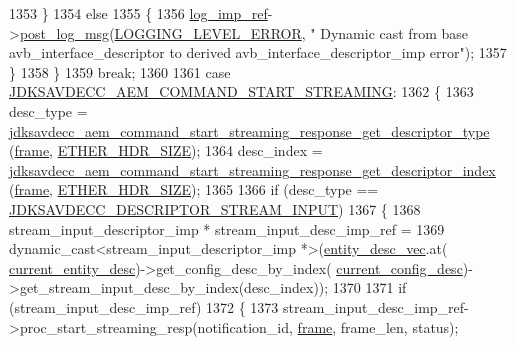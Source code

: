 \begin{DoxyCode}
{{{1353         \}
1354         \textcolor{keywordflow}{else}
1355         \{
1356             \hyperlink{namespaceavdecc__lib_acbe3e2a96ae6524943ca532c87a28529}{log\_imp\_ref}->\hyperlink{classavdecc__lib_1_1log_a68139a6297697e4ccebf36ccfd02e44a}{post\_log\_msg}(\hyperlink{namespaceavdecc__lib_a501055c431e6872ef46f252ad13f85cdaf2c4481208273451a6f5c7bb9770ec8a}{LOGGING\_LEVEL\_ERROR}, \textcolor{stringliteral}{"
      Dynamic cast from base avb\_interface\_descriptor to derived avb\_interface\_descriptor\_imp error"});
1357         \}
1358     \}
1359     \textcolor{keywordflow}{break};
1360 
1361     \textcolor{keywordflow}{case} \hyperlink{group__command_ga02c5a086ab474b1e4d7786286811a680}{JDKSAVDECC\_AEM\_COMMAND\_START\_STREAMING}:
1362     \{
1363         desc\_type = 
      \hyperlink{group__command__start__streaming__response_ga89f9710e58a269070610321fa9d67fc6}{jdksavdecc\_aem\_command\_start\_streaming\_response\_get\_descriptor\_type}
      (\hyperlink{gst__avb__playbin_8c_ac8e710e0b5e994c0545d75d69868c6f0}{frame}, \hyperlink{namespaceavdecc__lib_a6c827b1a0d973e18119c5e3da518e65ca9512ad9b34302ba7048d88197e0a2dc0}{ETHER\_HDR\_SIZE});
1364         desc\_index = 
      \hyperlink{group__command__start__streaming__response_ga5d4e2d26cf8b8a6301bf06db86c020c8}{jdksavdecc\_aem\_command\_start\_streaming\_response\_get\_descriptor\_index}
      (\hyperlink{gst__avb__playbin_8c_ac8e710e0b5e994c0545d75d69868c6f0}{frame}, \hyperlink{namespaceavdecc__lib_a6c827b1a0d973e18119c5e3da518e65ca9512ad9b34302ba7048d88197e0a2dc0}{ETHER\_HDR\_SIZE});
1365 
1366         \textcolor{keywordflow}{if} (desc\_type == \hyperlink{group__descriptor_ga4eb0b7597f11b5fc36f3625acd82e503}{JDKSAVDECC\_DESCRIPTOR\_STREAM\_INPUT})
1367         \{
1368             stream\_input\_descriptor\_imp * stream\_input\_desc\_imp\_ref =
1369                 \textcolor{keyword}{dynamic\_cast<}stream\_input\_descriptor\_imp *\textcolor{keyword}{>}(\hyperlink{classavdecc__lib_1_1end__station__imp_a72edab41bc56e3c1757944a7df188a3d}{entity\_desc\_vec}.at(
      \hyperlink{classavdecc__lib_1_1end__station__imp_afd78c89df26ba7641e1adb764c0e827d}{current\_entity\_desc})->get\_config\_desc\_by\_index(
      \hyperlink{classavdecc__lib_1_1end__station__imp_a60b1af40d35e8a86b0082c54ab6cb6a8}{current\_config\_desc})->get\_stream\_input\_desc\_by\_index(desc\_index));
1370 
1371             \textcolor{keywordflow}{if} (stream\_input\_desc\_imp\_ref)
1372             \{
1373                 stream\_input\_desc\_imp\_ref->proc\_start\_streaming\_resp(notification\_id, 
      \hyperlink{gst__avb__playbin_8c_ac8e710e0b5e994c0545d75d69868c6f0}{frame}, frame\_len, status);
}}}
\end{DoxyCode}
